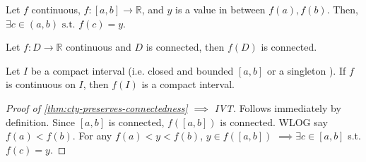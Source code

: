 \begin{theorem}
    \label{thm:IVT}
    Let $f$ continuous, $f: [a,b] \to \mathbb{R}$, and $y$ is a value 
    in between $f(a), f(b)$.
    Then, $\exists c \in (a, b) \text{ s.t. } f(c) = y$.
\end{theorem}


\begin{theorem}
    \label{thm:cty-preserves-connectedness}
    Let $f: D \to \mathbb{R}$ continuous and $D$ is connected, 
    then $f(D)$ is connected.
\end{theorem}

\begin{corollary}
    Let $I$ be a compact interval (i.e. closed and bounded $[a,b]$
    or a singleton
    ). If $f$ is continuous on $I$, then $f(I)$ is 
    a compact interval.
\end{corollary}


\begin{proof}[Proof of \ref{thm:cty-preserves-connectedness} $\implies$ IVT]
    Follows immediately by definition.
    Since $[a,b]$ is connected, 
    $f([a,b])$ is connected.
    WLOG say $f(a) < f(b)$.
    For any $f(a) < y < f(b)$, $y \in f([a,b])$
    $\implies \exists c \in [a, b]$ s.t. 
    $f(c) = y$.
\end{proof}


